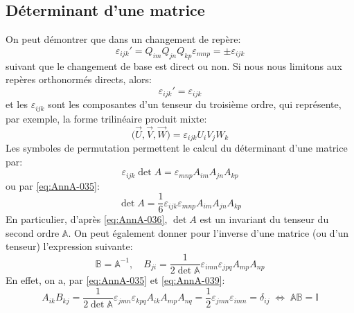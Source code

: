 \subsection{Déterminant d'une matrice}
On peut démontrer que dans un changement de repère:
\begin{equation}
    \varepsilon_{ijk}' = Q_{im} Q_{jn} Q_{kp} \varepsilon_{mnp} = \pm \varepsilon_{ijk}
    \label{eq:AnnA-036}
\end{equation}
suivant que le changement de base est direct ou non.
Si nous nous limitons aux repères orthonormés directs, alors:
\begin{equation}
    \varepsilon_{ijk}' = \varepsilon_{ijk}
    \label{eq:AnnA-037}
\end{equation}
et les $\varepsilon_{ijk}$ sont les composantes d'un tenseur du troisième ordre, qui représente, par exemple, la forme trilinéaire produit mixte:
\begin{equation}
    \bigl( \vec{U}, \vec{V}, \vec{W} \bigr) = \varepsilon_{ijk} U_i V_j W_k
    \label{eq:AnnA-038}
\end{equation}
Les symboles de permutation permettent le calcul du déterminant d'une matrice par:
\begin{equation}
    \varepsilon_{ijk} \det A = \varepsilon_{mnp} A_{im} A_{jn} A_{kp}
    \label{eq:AnnA-039}
\end{equation}
ou par \eqref{eq:AnnA-035}:
\begin{equation}
    \det A = \frac{1}{6} \varepsilon_{ijk} \varepsilon_{mnp} A_{im} A_{jn} A_{kp}
    \label{eq:AnnA-040}
\end{equation}
En particulier, d'après \eqref{eq:AnnA-036}, $\det A$ est un invariant du tenseur du second ordre $\mathbb{A}$.
On peut également donner pour l'inverse d'une matrice (ou d'un tenseur) l'expression suivante:
\begin{equation}
    \mathbb{B} = \mathbb{A}^{-1}, \quad B_{ji} = \frac{1}{2 \det \mathbb{A}} \varepsilon_{imn} \varepsilon_{jpq} A_{mp} A_{np}
    \label{eq:AnnA-041}
\end{equation}
En effet, on a, par \eqref{eq:AnnA-035} et \eqref{eq:AnnA-039}:
\begin{equation}
    A_{ik} B_{kj} = \frac{1}{2 \det \mathbb{A}} \varepsilon_{jmn} \varepsilon_{kpq} A_{ik} A_{mp} A_{nq} 
    = \frac{1}{2} \varepsilon_{jmn} \varepsilon_{imn} = \delta_{ij}
\;\Leftrightarrow\;\mathbb{A} \mathbb{B} = \mathbb{I}\end{equation}
